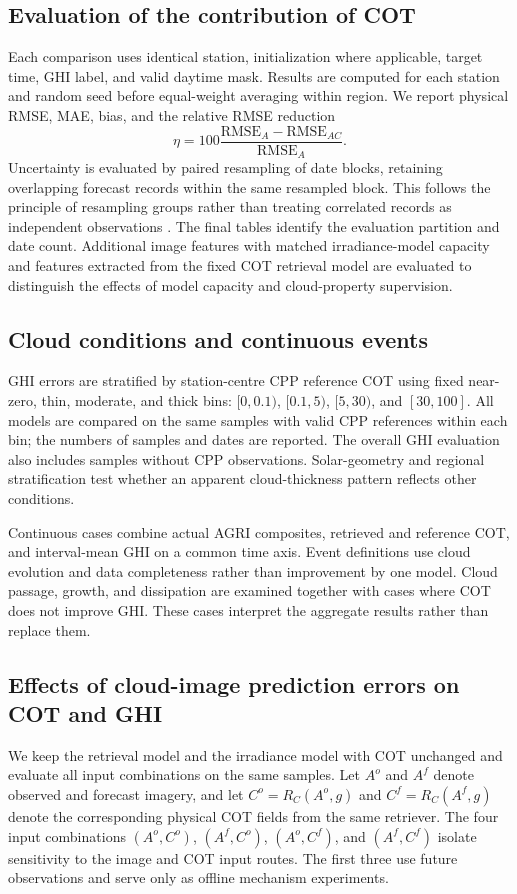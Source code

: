 \documentclass[11pt]{article}
\begin{document}
\subsection{Evaluation of the contribution of COT}
Each comparison uses identical station, initialization where applicable, target time, GHI label, and valid daytime mask. Results are computed for each station and random seed before equal-weight averaging within region. We report physical RMSE, MAE, bias, and the relative RMSE reduction
\begin{equation}
\eta=100\frac{\mathrm{RMSE}_{A}-\mathrm{RMSE}_{AC}}{\mathrm{RMSE}_{A}}.
\label{eq:gain}
\end{equation}
Uncertainty is evaluated by paired resampling of date blocks, retaining overlapping forecast records within the same resampled block. This follows the principle of resampling groups rather than treating correlated records as independent observations \cite{field2007}. The final tables identify the evaluation partition and date count. Additional image features with matched irradiance-model capacity and features extracted from the fixed COT retrieval model are evaluated to distinguish the effects of model capacity and cloud-property supervision.

\subsection{Cloud conditions and continuous events}
GHI errors are stratified by station-centre CPP reference COT using fixed near-zero, thin, moderate, and thick bins: $[0,0.1)$, $[0.1,5)$, $[5,30)$, and $[30,100]$. All models are compared on the same samples with valid CPP references within each bin; the numbers of samples and dates are reported. The overall GHI evaluation also includes samples without CPP observations. Solar-geometry and regional stratification test whether an apparent cloud-thickness pattern reflects other conditions.

Continuous cases combine actual AGRI composites, retrieved and reference COT, and interval-mean GHI on a common time axis. Event definitions use cloud evolution and data completeness rather than improvement by one model. Cloud passage, growth, and dissipation are examined together with cases where COT does not improve GHI. These cases interpret the aggregate results rather than replace them.

\subsection{Effects of cloud-image prediction errors on COT and GHI}
We keep the retrieval model and the irradiance model with COT unchanged and evaluate all input combinations on the same samples. Let $A^o$ and $A^f$ denote observed and forecast imagery, and let $C^o=R_C(A^o,g)$ and $C^f=R_C(A^f,g)$ denote the corresponding physical COT fields from the same retriever. The four input combinations $(A^o,C^o)$, $(A^f,C^o)$, $(A^o,C^f)$, and $(A^f,C^f)$ isolate sensitivity to the image and COT input routes. The first three use future observations and serve only as offline mechanism experiments.
\end{document}
